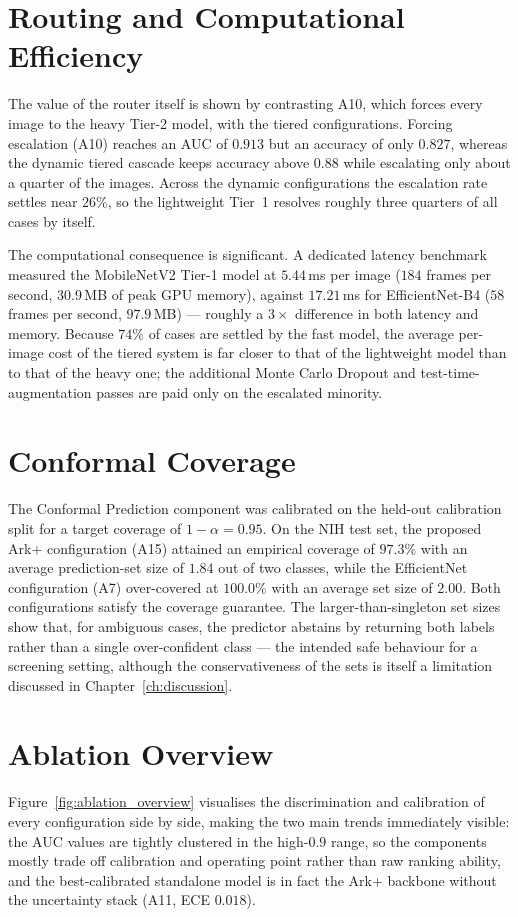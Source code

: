 \section{Routing and Computational Efficiency}
The value of the router itself is shown by contrasting A10, which forces every image to the heavy Tier-2 model, with the tiered configurations. Forcing escalation (A10) reaches an AUC of $0.913$ but an accuracy of only $0.827$, whereas the dynamic tiered cascade keeps accuracy above $0.88$ while escalating only about a quarter of the images. Across the dynamic configurations the escalation rate settles near $26\%$, so the lightweight Tier~1 resolves roughly three quarters of all cases by itself.

The computational consequence is significant. A dedicated latency benchmark measured the MobileNetV2 Tier-1 model at $5.44$\,ms per image ($184$ frames per second, $30.9$\,MB of peak GPU memory), against $17.21$\,ms for EfficientNet-B4 ($58$ frames per second, $97.9$\,MB) --- roughly a $3\times$ difference in both latency and memory. Because $74\%$ of cases are settled by the fast model, the average per-image cost of the tiered system is far closer to that of the lightweight model than to that of the heavy one; the additional Monte Carlo Dropout and test-time-augmentation passes are paid only on the escalated minority.

\section{Conformal Coverage}
The Conformal Prediction component was calibrated on the held-out calibration split for a target coverage of $1 - \alpha = 0.95$. On the NIH test set, the proposed Ark+ configuration (A15) attained an empirical coverage of $97.3\%$ with an average prediction-set size of $1.84$ out of two classes, while the EfficientNet configuration (A7) over-covered at $100.0\%$ with an average set size of $2.00$. Both configurations satisfy the coverage guarantee. The larger-than-singleton set sizes show that, for ambiguous cases, the predictor abstains by returning both labels rather than a single over-confident class --- the intended safe behaviour for a screening setting, although the conservativeness of the sets is itself a limitation discussed in Chapter~\ref{ch:discussion}.

\section{Ablation Overview}
Figure~\ref{fig:ablation_overview} visualises the discrimination and calibration of every configuration side by side, making the two main trends immediately visible: the AUC values are tightly clustered in the high-$0.9$ range, so the components mostly trade off calibration and operating point rather than raw ranking ability, and the best-calibrated standalone model is in fact the Ark+ backbone without the uncertainty stack (A11, ECE $0.018$).


